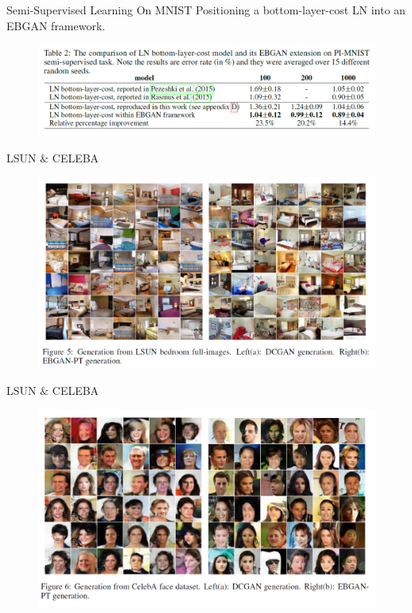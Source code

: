 \documentclass[mathserif]{beamer}
\begin{document}
\begin{frame}{Semi-Supervised Learning On MNIST}
Positioning a bottom-layer-cost LN into an EBGAN framework.
\begin{figure}
  \includegraphics[scale=0.5]{fig/8.png}
  \label{}
\end{figure}
\end{frame}
\begin{frame}{LSUN $\&$ CELEBA}
  \begin{figure}
    \includegraphics[scale=0.5]{fig/9.png}
    \label{}
  \end{figure}
\end{frame}
\begin{frame}{LSUN $\&$ CELEBA}
  \begin{figure}
    \includegraphics[scale=0.5]{fig/10.png}
    \label{}
  \end{figure}
\end{frame}
\end{document}
